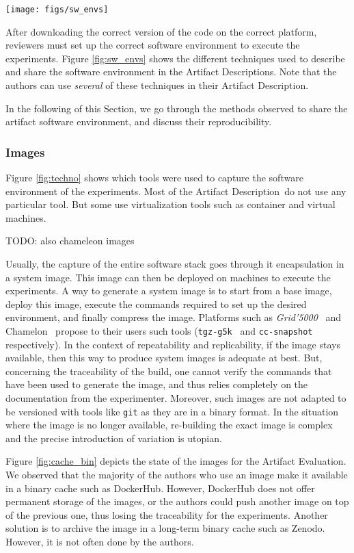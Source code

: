 \documentclass[sigconf]{acmart}
\newcommand{\grid}{\emph{Grid'5000}}
\newcommand{\ad}{Artifact Description}
\newcommand{\aeval}{Artifact Evaluation}
\newcommand{\todo}[1]{{\color{red}TODO: #1}}
\begin{document}
\begin{figure*}
  \centering
  \texttt{[image: figs/sw\_envs]}
  \caption{}\label{fig:sw_envs}
\end{figure*}

After downloading the correct version of the code on the correct platform, reviewers must set up the correct software environment to execute the experiments.
Figure \ref{fig:sw_envs} shows the different techniques used to describe and share the software environment in the \ad s.
Note that the authors can use \emph{several} of these techniques in their \ad.

In the following of this Section, we go through the methods observed to share the artifact software environment, and discuss their reproducibility.

\subsubsection{Images}

Figure \ref{fig:techno} shows which tools were used to capture the software environment of the experiments.
Most of the \ad\ do not use any particular tool.
But some use virtualization tools such as container and virtual machines.

\todo{also chameleon images}

Usually, the capture of the entire software stack goes through it encapsulation in a system image.
This image can then be deployed on machines to execute the experiments.
A way to generate a system image is to start from a base image, deploy this image, execute the commands required to set up the desired environment, and finally compress the image.
Platforms such as \grid\ \cite{grid5000} and Chamelon\ \cite{chameleon} propose to their users such tools (\texttt{tgz-g5k}\ \cite{tgz-g5k} and \texttt{cc-snapshot}\ \cite{cc-snapshot} respectively).
In the context of repeatability and replicability, if the image stays available, then this way to produce system images is adequate at best.
But, concerning the traceability of the build, one cannot verify the commands that have been used to generate the image, and thus relies completely on the documentation from the experimenter.
Moreover, such images are not adapted to be versioned with tools like \texttt{git} as they are in a binary format.
In the situation where the image is no longer available, re-building the exact image is complex and the precise introduction of variation is utopian.

Figure \ref{fig:cache_bin} depicts the state of the images for the \aeval.
We observed that the majority of the authors who use an image make it available in a binary cache such as DockerHub. 
However, DockerHub does not offer permanent storage of the images, or the authors could push another image on top of the previous one, thus losing the traceability for the experiments.
Another solution is to archive the image in a long-term binary cache such as Zenodo.
However, it is not often done by the authors.
\end{document}
